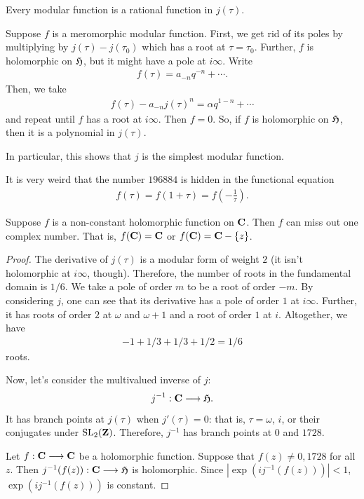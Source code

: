 \documentclass[11pt, oneside,margin=1in]{article}
\begin{document}
\begin{proposition}[ ]\label{}\text{}
Every modular function is a rational function in $j(\tau)$.
\end{proposition}

Suppose $f$ is a meromorphic modular function. First, we get rid of its poles by multiplying by $j(\tau)- j (\tau_0)$ which has a root at $\tau=\tau_0$. Further, $f$ is holomorphic on $\mathfrak H$, but it might have a pole at $i\infty$. Write 
\begin{align*}
	f(\tau) = a_{-n}q^{-n} +\cdots.
\end{align*}
Then, we take
\begin{align*}
	f(\tau) - a_{-n} j (\tau) ^n = \alpha q^{1-n} + \cdots
\end{align*}
and repeat until $f$ has a root at $i\infty$. Then $f=0$. So, if $f$ is holomorphic on $\mathfrak H$, then it is a polynomial in $j(\tau)$. 

In particular, this shows that $j$ is the simplest modular function. 
\begin{remark}
	It is very weird that the number $196884$ is hidden in the functional equation
	\begin{align*}
		f(\tau) = f (1 + \tau) = f  \left( - \frac{1}{\tau} \right).
	\end{align*}
\end{remark}

\begin{theorem}[Picard]\label{}\index{}\text{}
Suppose $f$ is a non-constant holomorphic function on $\mathbf C$. Then $f$ can miss out one complex number. That is, $f(\mathbf C) = \mathbf C$ or $f(\mathbf C)= \mathbf C -  \{z\}$.
\end{theorem}

\begin{proof}
The derivative of $j(\tau)$ is a modular form of weight $2$ (it isn't holomorphic at $i\infty$, though). Therefore, the number of roots in the fundamental domain is $1/6$. We take a pole of order $m$ to be a root of order $-m$. By considering $j$, one can see that its derivative has a pole of order $1$ at $i\infty$. Further, it has roots of order $2$ at $\omega$ and $\omega + 1$ and a root of order $1$ at $i$. Altogether, we have
\begin{align*}
	-1 + 1/3 + 1/3 + 1/2 = 1/6
\end{align*}
roots.

Now, let's consider the multivalued inverse of $j$:
\begin{align*}
	j^{-1} : \mathbf C \longrightarrow \mathfrak H.
\end{align*}
It has branch points at $j(\tau)$ when $j'(\tau) = 0$: that is, $\tau = \omega$, $i$, or their conjugates under $\operatorname{SL}_{2}(\mathbf Z)$. Therefore, $j^{-1}$ has branch points at $0$ and $1728$. 

Let $f:\mathbf C\longrightarrow \mathbf C$ be a holomorphic function. Suppose that $f(z) \ne 0,1728$ for all $z$. Then $j^{-1}(f(z)):\mathbf C\longrightarrow \mathfrak H$ is holomorphic. Since $\left\lvert \exp(ij^{-1}(f(z))) \right\rvert <1$, $\exp(i j^{-1}(f(z)))$ is constant.
\end{proof}
\end{document}
